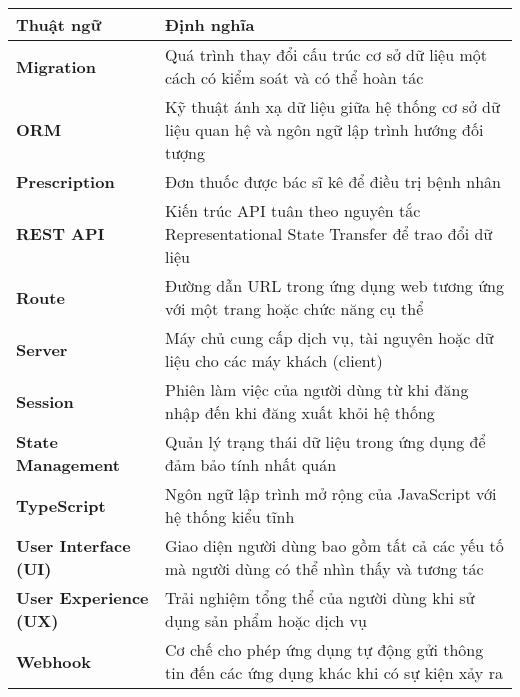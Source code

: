 \documentclass[../DoAn.tex]{subfiles}
\begin{document}
\begin{tabular}{p{3.5cm} p{10.5cm}}
	\textbf{Thuật ngữ}  & \textbf{Định nghĩa} \\ 
	\hline
	\textbf{Migration} & Quá trình thay đổi cấu trúc cơ sở dữ liệu một cách có kiểm soát và có thể hoàn tác \\
	\textbf{ORM} & Kỹ thuật ánh xạ dữ liệu giữa hệ thống cơ sở dữ liệu quan hệ và ngôn ngữ lập trình hướng đối tượng \\
	\textbf{Prescription} & Đơn thuốc được bác sĩ kê để điều trị bệnh nhân \\
	\textbf{REST API} & Kiến trúc API tuân theo nguyên tắc Representational State Transfer để trao đổi dữ liệu \\
	\textbf{Route} & Đường dẫn URL trong ứng dụng web tương ứng với một trang hoặc chức năng cụ thể \\
	\textbf{Server} & Máy chủ cung cấp dịch vụ, tài nguyên hoặc dữ liệu cho các máy khách (client) \\
	\textbf{Session} & Phiên làm việc của người dùng từ khi đăng nhập đến khi đăng xuất khỏi hệ thống \\
	\textbf{State Management} & Quản lý trạng thái dữ liệu trong ứng dụng để đảm bảo tính nhất quán \\
	\textbf{TypeScript} & Ngôn ngữ lập trình mở rộng của JavaScript với hệ thống kiểu tĩnh \\
	\textbf{User Interface (UI)} & Giao diện người dùng bao gồm tất cả các yếu tố mà người dùng có thể nhìn thấy và tương tác \\
	\textbf{User Experience (UX)} & Trải nghiệm tổng thể của người dùng khi sử dụng sản phẩm hoặc dịch vụ \\
	\textbf{Webhook} & Cơ chế cho phép ứng dụng tự động gửi thông tin đến các ứng dụng khác khi có sự kiện xảy ra \\
\end{tabular}
\end{document}
